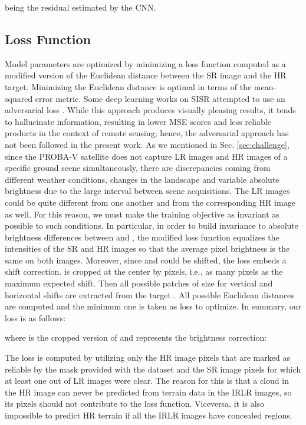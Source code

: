 \documentclass[journal]{IEEEtran}
\begin{document}
being  the residual estimated by the CNN.

\subsection{Loss Function}
\label{subsec:loss}
Model parameters are optimized by minimizing a loss function computed as a modified version of the Euclidean distance between the SR image and the HR target. Minimizing the Euclidean distance is optimal in terms of the mean-squared error metric. Some deep learning works on SISR attempted to use an adversarial loss \cite{ledig2017photo}. While this approach produces visually pleasing results, it tends to hallucinate information, resulting in lower MSE scores and less reliable products in the context of remote sensing; hence, the adversarial approach has not been followed in the present work.
As we mentioned in Sec. \ref{sec:challenge}, since the PROBA-V satellite does not capture LR images and HR images of a specific ground scene simultaneously, there are discrepancies coming from different weather conditions, changes in the landscape and variable absolute brightness due to the large interval between scene acquisitions. The LR images could be quite different from one another and from the corresponding HR image as well. For this reason, we must make the training objective as invariant as possible to such conditions. In particular, in order to build invariance to absolute brightness differences between  and , the modified loss function equalizes the intensities of the SR and HR images so that the average pixel brightness is the same on both images.
Moreover, since  and  could be shifted, the loss embeds a shift correction.  is cropped at the center by  pixels, i.e., as many pixels as the maximum expected shift. Then all possible patches  of size  for vertical and horizontal shifts  are extracted from the target . All possible Euclidean distances are computed and the minimum one is taken as loss to optimize.
In summary, our loss is as follows:

where  is the cropped version of  and  represents the brightness correction:



The loss is computed by utilizing only the HR image pixels that are marked as reliable by the mask provided with the dataset and the SR image pixels for which at least one out of  LR images were clear. The reason for this is that a cloud in the HR image can never be predicted from terrain data in the IRLR images, so its pixels should not contribute to the loss function. Viceversa, it is also impossible to predict HR terrain if all the IRLR images have concealed regions. 
\end{document}
